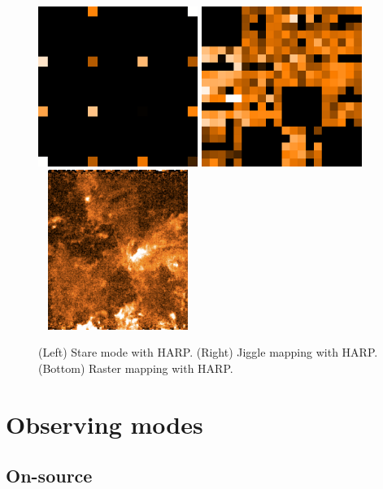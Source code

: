 \documentclass[11pt,oneside,chapters]{starlink}
\begin{document}
\begin{figure}[t!]
\begin{center}
\includegraphics[width=5.2cm, height=5.2cm]{sc20_stare}
\includegraphics[width=5.2cm, height=5.2cm]{sc20_jiggle}
\includegraphics[width=5.2cm, height=5.2cm]{sc20_raster}
\caption[Stare, jiggle and raster observing modes]{\label{fig:harpmodes}
  (Left) Stare mode with HARP. (Right) Jiggle mapping with HARP.
  (Bottom) Raster mapping with HARP.}
\end{center}
\end{figure}


\section{Observing modes}
\label{sec:obsmodes}

\subsection{On-source}
\end{document}
